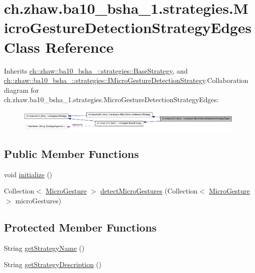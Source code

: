 \hypertarget{classch_1_1zhaw_1_1ba10__bsha__1_1_1strategies_1_1MicroGestureDetectionStrategyEdges}{
\section{ch.zhaw.ba10\_\-bsha\_\-1.strategies.MicroGestureDetectionStrategyEdges Class Reference}
\label{classch_1_1zhaw_1_1ba10__bsha__1_1_1strategies_1_1MicroGestureDetectionStrategyEdges}
}


Inherits \hyperlink{classch_1_1zhaw_1_1ba10__bsha__1_1_1strategies_1_1BaseStrategy}{ch::zhaw::ba10\_\-bsha\_::strategies::BaseStrategy}, and \hyperlink{interfacech_1_1zhaw_1_1ba10__bsha__1_1_1strategies_1_1IMicroGestureDetectionStrategy}{ch::zhaw::ba10\_\-bsha\_::strategies::IMicroGestureDetectionStrategy}.Collaboration diagram for ch.zhaw.ba10\_\-bsha\_\-1.strategies.MicroGestureDetectionStrategyEdges:\nopagebreak
\begin{figure}[H]
\begin{center}
\leavevmode
\includegraphics[width=400pt]{classch_1_1zhaw_1_1ba10__bsha__1_1_1strategies_1_1MicroGestureDetectionStrategyEdges__coll__graph}
\end{center}
\end{figure}
\subsection*{Public Member Functions}
\begin{DoxyCompactItemize}
\item 
void \hyperlink{classch_1_1zhaw_1_1ba10__bsha__1_1_1strategies_1_1MicroGestureDetectionStrategyEdges_ab4abee912f5692af0155d1770c354108}{initialize} ()
\item 
Collection$<$ \hyperlink{classch_1_1zhaw_1_1ba10__bsha__1_1_1service_1_1MicroGesture}{MicroGesture} $>$ \hyperlink{classch_1_1zhaw_1_1ba10__bsha__1_1_1strategies_1_1MicroGestureDetectionStrategyEdges_a16cd0b9ef604ba14a7eb573a77966c4f}{detectMicroGestures} (Collection$<$ \hyperlink{classch_1_1zhaw_1_1ba10__bsha__1_1_1service_1_1MicroGesture}{MicroGesture} $>$ microGestures)
\end{DoxyCompactItemize}
\subsection*{Protected Member Functions}
\begin{DoxyCompactItemize}
\item 
String \hyperlink{classch_1_1zhaw_1_1ba10__bsha__1_1_1strategies_1_1MicroGestureDetectionStrategyEdges_a7ae8347737b8180278eb34f6d5cbba1d}{getStrategyName} ()
\item 
String \hyperlink{classch_1_1zhaw_1_1ba10__bsha__1_1_1strategies_1_1MicroGestureDetectionStrategyEdges_ae0338811d57c4b4b96705b71c5edfc43}{getStrategyDescription} ()
\end{DoxyCompactItemize}

